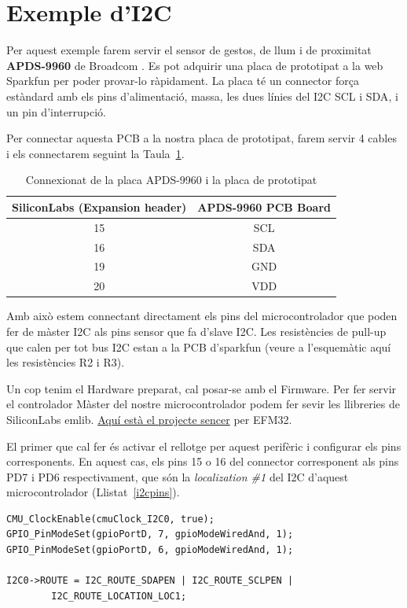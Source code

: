 \section{Exemple d'I2C}
\label{sub:I2C_example}
Per aquest exemple farem servir el sensor de gestos, de llum i de proximitat {\bf APDS-9960} de Broadcom \cite{apds9960}. Es pot adquirir una placa de prototipat a la web Sparkfun per poder provar-lo ràpidament. La placa té un connector força estàndard amb els pins d'alimentació, massa, les dues línies del \gls{I2C} \gls{SCL} i \gls{SDA}, i un pin d'interrupció.

Per connectar aquesta \gls{PCB} a la nostra placa de prototipat, farem servir 4 cables i els connectarem seguint la Taula~\ref{tb:I2C}.

\begin{table}
\caption{Connexionat de la placa APDS-9960 i la placa de prototipat}
\label{tb:I2C}
\centering
\begin{tabular}{|c|c|}
\hline
{\bf SiliconLabs (Expansion header)}	 & {\bf APDS-9960 PCB Board}\\
\hline
15 & SCL\\
\hline
16 & SDA\\
\hline
19 & GND\\
\hline
20 & VDD\\
\hline
\end{tabular}

\end{table}

Amb això estem connectant directament els pins del microcontrolador que poden fer de màster \gls{I2C} als pins sensor que fa d'slave I2C. Les resistències de \gls{pull-up} que calen per tot bus I2C estan a la PCB d'sparkfun (veure a l'esquemàtic aquí les resistències R2 i R3).

Un cop tenim el Hardware preparat, cal posar-se amb el Firmware. Per fer servir el controlador Màster del nostre microcontrolador podem fer sevir les llibreries de SiliconLabs emlib. \href{https://github.com/mariusmm/cursembedded/tree/master/Simplicity/I2C_1}{Aquí està el projecte sencer} per EFM32.

El primer que cal fer és activar el rellotge per aquest perifèric i configurar els pins corresponents. En aquest cas, els pins 15 o 16 del connector corresponent als pins PD7 i PD6 respectivament, que són la {\em localization \#1} del I2C d'aquest microcontrolador (Llistat~\ref{i2cpins}).
\begin{lstlisting}[frame=single,style=customc, label=i2cpins, caption={Initialització dels pins per l'I2C}]
CMU_ClockEnable(cmuClock_I2C0, true);
GPIO_PinModeSet(gpioPortD, 7, gpioModeWiredAnd, 1);
GPIO_PinModeSet(gpioPortD, 6, gpioModeWiredAnd, 1);

I2C0->ROUTE = I2C_ROUTE_SDAPEN | I2C_ROUTE_SCLPEN |
        I2C_ROUTE_LOCATION_LOC1;
\end{lstlisting}


